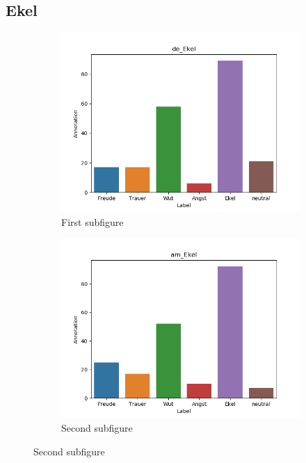 \documentclass[11pt,a4paper,headsepline,twoside,toc=bibliography]{scrreprt}
\begin{document}
\subsection{Ekel}

\begin{figure}[t!] %
	\begin{subfigure}{0.48\textwidth}
		\includegraphics[width=\linewidth]{plots/de_Ekel.png}
		\caption{First subfigure} \label{fig:de_E}
	\end{subfigure}\hspace*{\fill}
	\begin{subfigure}{0.48\textwidth}
		\includegraphics[width=\linewidth]{plots/am_Ekel.png}
		\caption{Second subfigure} \label{fig:am_E}
	\end{subfigure}
	

\end{figure}
\end{document}

